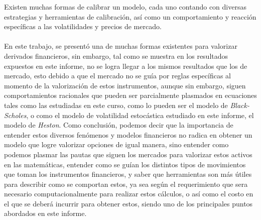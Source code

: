 \noindent Existen muchas formas de calibrar un modelo, cada uno contando con diversas estrategias y herramientas de calibración, así como un comportamiento y reacción específicas a las volatilidades y precios de mercado. \\\\
\noindent En este trabajo, se presentó una de muchas formas existentes para valorizar derivados financieros, sin embargo, tal como se muestra en los resultados expuestos en este informe, no se logra llegar a los mismos resultados que los de mercado, esto debido a que el mercado no se guía por reglas específicas al momento de la valorización de estos instrumentos, aunque sin embargo, siguen comportamientos racionales que pueden ser parcialmente plasmados en ecuaciones tales como las estudiadas en este curso, como lo pueden ser el modelo de \textit{Black-Scholes}, o como el modelo de volatilidad estocástica estudiado en este informe, el modelo de \textit{Heston}. Como conclusión, podemos decir que la importancia de entender estos diversos fenómenos y modelos financieros no radica en obtener un modelo que logre valorizar opciones de igual manera, sino entender como podemos plasmar las pautas que siguen los mercados para valorizar estos activos en las matemáticas, entender como se guían los distintos tipos de movimientos que toman los instrumentos financieros, y saber que herramientas son más útiles para describir como se comportan estos, ya sea según el requerimiento que sera necesario computacionalmente para realizar estos cálculos, o así como el costo en el que se deberá incurrir para obtener estos, siendo uno de los principales puntos abordados en este informe.
\newpage





